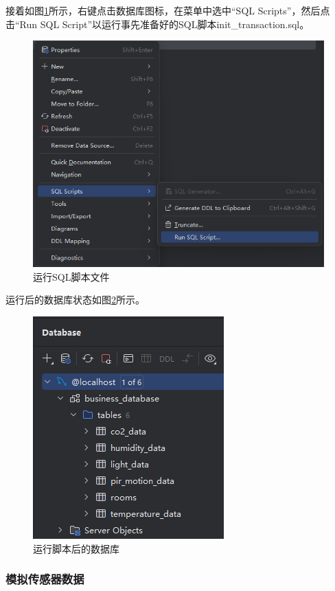 接着如图\ref{run}所示，右键点击数据库图标，在菜单中选中“SQL Scripts”，然后点击“Run SQL Script”以运行事先准备好的SQL脚本init\_transaction.sql。

\begin{figure}[!htbp]
    \centering
    \includegraphics[width=\textwidth]{images/run_script.png}
    \caption{运行SQL脚本文件}\label{run}
\end{figure}

运行后的数据库状态如图\ref{db1}所示。

\begin{figure}[!htbp]
    \centering
    \includegraphics[scale=1]{images/db1.png}
    \caption{运行脚本后的数据库}\label{db1}
\end{figure}


\subsubsection{模拟传感器数据}

